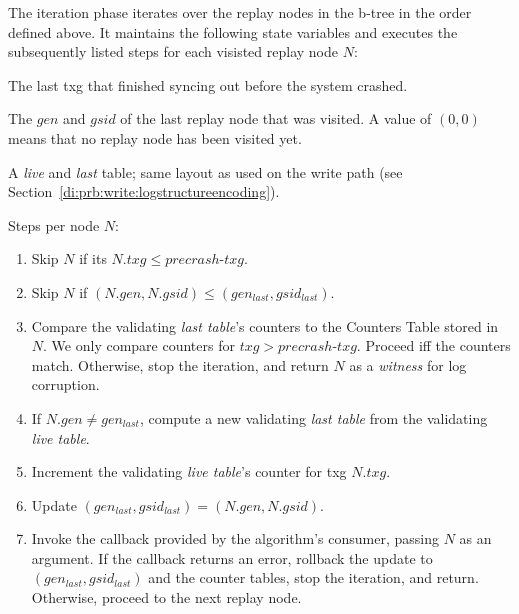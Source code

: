 \documentclass[12pt,a4paper,twoside]{book}
\begin{document}
\begin{samepage}
The iteration phase iterates over the replay nodes in the b-tree in the order defined above.
It maintains the following state variables and executes the subsequently listed steps for each visisted replay node $N$:
 \begin{description}[noitemsep,leftmargin=1.5cm,labelindent=1cm]
    \item[precrash-txg] The last txg that finished syncing out before the system crashed.
    \item[$\mathbf{(gen_{last}, gsid_{last})}$] The $gen$ and $gsid$ of the last replay node that was visited.
        A value of $(0,0)$ means that no replay node has been visited yet.
    \item[validating counter tables] A \textit{live} and \textit{last} table; same layout as used on the write path (see Section~\ref{di:prb:write:logstructureencoding}).
\end{description}
Steps per node $N$:
\begin{enumerate}[noitemsep]
    \item \label{replayStep:skiptxg} Skip $N$ if its $N.txg \le precrash\text{-}txg$.
    \item \label{replayStep:skipreplayed} Skip $N$ if $(N.gen,N.gsid) \le (gen_{last}, gsid_{last})$.
    \item \label{replayStep:validate} Compare the validating \textit{last table}'s counters to the Counters Table stored in $N$.
        We only compare counters for $txg > precrash\text{-}txg$.
        Proceed iff the counters match. Otherwise, stop the iteration, and return $N$ as a \textit{witness} for log corruption.
    \item \label{replayStep:bump1} If $N.gen \neq gen_{last}$, compute a new validating \textit{last table} from the validating \textit{live table}.
    \item \label{replayStep:bump2} Increment the validating \textit{live table}'s counter for txg $N.txg$.
    \item \label{replayStep:bump3} Update $(gen_{last}, gsid_{last}) = (N.gen, N.gsid)$.
    \item \label{replayStep:invoke} Invoke the callback provided by the algorithm's consumer, passing $N$ as an argument.
        If the callback returns an error, rollback the update to $(gen_{last}, gsid_{last})$ and the counter tables, stop the iteration, and return.
        Otherwise, proceed to the next replay node.
\end{enumerate}
\end{samepage}
\end{document}
